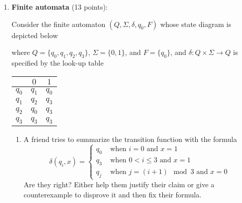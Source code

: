 \begin{enumerate}[wide, labelwidth=!, labelindent=0pt]
\item\gradeCorrect \textbf{Finite automata} (13 points):

Consider the finite automaton $(Q, \Sigma, \delta, q_0, F)$ whose state diagram is depicted below
\begin{center}
\end{center}
where $Q = \{q_0, q_1, q_2, q_3\}$, $\Sigma = \{0,1\}$, and $F = \{q_0\}$, and $\delta: Q \times \Sigma \to Q$
is specified by the look-up table
\begin{center}
\begin{tabular}{c|cc}
        & $0$ & $1$ \\
    \hline
  $q_0$ & $q_1$ & $q_0$ \\
  $q_1$ & $q_2$ & $q_3$ \\
  $q_2$ & $q_0$ & $q_3$ \\
  $q_3$ & $q_3$ & $q_3$
\end{tabular}
\end{center}
    \begin{enumerate}
    \item  A friend tries to summarize the transition function with the formula
    \[
        \delta(q_i,x) = \begin{cases}
            q_0 &\text{ when $i=0$ and $x=1$} \\
            q_3 &\text{ when $0<i\leq 3$ and $x=1$}\\
            q_j &\text{ when $j = (i+1) \mod 3$ and $x=0$}
        \end{cases}
    \]
    Are they right? Either help them justify their claim or give a counterexample to disprove it and then 
    fix their formula.


\end{enumerate}
\end{enumerate}
